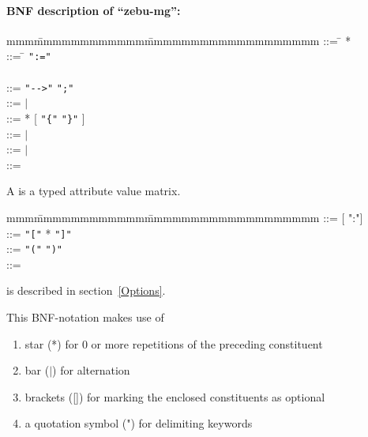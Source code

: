 \paragraph {BNF description of ``zebu-mg'':}
{\samepage \begin{tabbing}
mmm\=mmmmmmmmmmmm\=mmmmmmmmmmmmmmmmmmm\kill
 \>\> ::= \=  *  \\
 \> \> ::= \=  \verb+":="+
 \\
 \> \> \\
 \>     \> ::=  \verb+"-->"+
 {\tt ";"}\\
 \>         \> ::=   $|$ \\
 \>        \> ::= * [ {\tt "\{"}
 {\tt "\}"} ]\\
 \> \> ::=  $|$ \\
 \>    \> ::= $|$  \\
 \>   \> ::= \\
\end{tabbing}}


A  is a typed attribute value matrix.
\begin{tabbing}
mmm\=mmmmmmmmmmmm\=mmmmmmmmmmmmmmmmmmm\kill
 \>      \> ::= [ ":"] \\
 \>           \> ::= {\tt "["}  * {\tt "]"}\\
 \> \> ::= {\tt "("} 
 {\tt ")"} \\
 \> \> ::= 
\end{tabbing}

 is described in section~\ref{Options}.

This BNF-notation makes use of
\begin{enumerate}
  \item star (*) for 0 or more repetitions of the preceding constituent
  \item bar ($|$) for alternation
  \item brackets ([]) for marking the enclosed constituents as optional
  \item a quotation symbol (") for delimiting keywords        
\end{enumerate}

